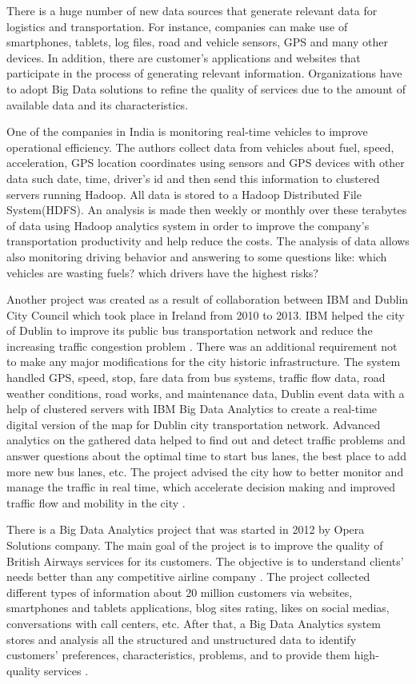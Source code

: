 \documentclass[runningheads]{llncs}
\begin{document}
There is a huge number of new data sources that generate relevant data for logistics and transportation. For instance, companies can make use of smartphones, tablets, log files, road and vehicle sensors, GPS and many other devices. In addition, there are customer's applications and websites that participate in the process of generating relevant information. Organizations have to adopt Big Data solutions to refine the quality of services due to the amount of available data and its characteristics.

One of the companies in India is monitoring real-time vehicles to improve operational efficiency. The authors collect data from vehicles about fuel, speed, acceleration, GPS location coordinates using sensors and GPS devices with other data such date, time, driver's id and then send this information to clustered servers running Hadoop. All data is stored to a Hadoop Distributed File System(HDFS). An analysis is made then weekly or monthly over these terabytes of data using Hadoop analytics system in order to improve the company's transportation productivity and help reduce the costs. The analysis of data allows also monitoring driving behavior and answering to some questions like: which vehicles are wasting fuels? which drivers have the highest risks? \cite{TRANSPORT}

Another project was created as a result of collaboration between IBM and Dublin City Council which took place in Ireland from 2010 to 2013. IBM helped the city of Dublin to improve its public bus transportation network and reduce the increasing traffic congestion problem \cite{TRANSPORTREPORT}. There was an additional requirement not to make any major modifications for the city historic infrastructure. The system handled GPS, speed, stop, fare data from bus systems, traffic flow data, road weather conditions, road works, and maintenance data, Dublin event data with a help of clustered servers with IBM Big Data Analytics to create a real-time digital version of the map for Dublin city transportation network. Advanced analytics on the gathered data helped to find out and detect traffic problems and answer questions about the optimal time to start bus lanes, the best place to add more new bus lanes, etc. The project advised the city how to better monitor and manage the traffic in real time, which accelerate decision making and improved traffic flow and mobility in the city \cite{TRANSPORT}. 

There is a Big Data Analytics project that was started in 2012 by Opera Solutions company. The main goal of the project is to improve the quality of British Airways services for its customers. The objective is to understand clients' needs better than any competitive airline company \cite{TRANSPORTREPORT}. The project collected different types of information about 20 million customers via websites, smartphones and tablets applications, blog sites rating, likes on social medias, conversations with call centers, etc. After that, a Big Data Analytics system stores and analysis all the structured and unstructured data to identify customers' preferences, characteristics, problems, and to provide them high-quality services \cite{TRANSPORT}. 
\end{document}
